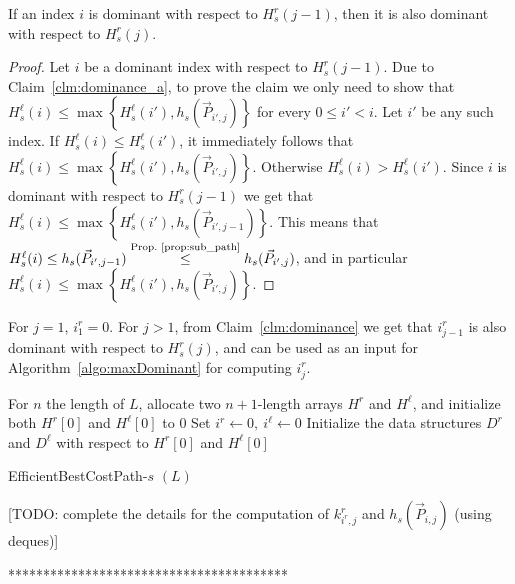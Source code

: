 \begin{claim}
	\label{clm:dominance}
	If an index $i$ is dominant with respect to $H^r_s(j-1)$, then it is also dominant with respect to  $H^r_s(j)$.
\end{claim}

\begin{proof}
	Let $i$ be a dominant index with respect to $H^r_s(j-1)$. Due to Claim~\ref{clm:dominance_a}, to prove the claim we only need to show that $H^\ell_s(i) \leq \max\left\{H^\ell_s(i'), h_s(\vec{P}_{i', j})\right\}$ for every $0 \leq i' < i$.
	Let $i'$ be any such index.
	If $H^\ell_s(i) \leq H^\ell_s(i')$, it immediately follows that $H^\ell_s(i) \leq \max\left\{H^\ell_s(i'), h_s(\vec{P}_{i', j})\right\}$.
	Otherwise  $H^\ell_s(i) > H^\ell_s(i')$. Since $i$ is dominant with respect to $H^r_s(j-1)$ we get that $H^\ell_s(i) \leq \max\left\{H^\ell_s(i'), h_s(\vec{P}_{i', j-1})\right\}$. This means that $H^\ell_s(i) \leq h_s(\vec{P}_{i', j-1}) \stackrel{\text{Prop.~\ref{prop:sub_path}}}{\leq} h_s(\vec{P}_{i', j})$, and in particular $H^\ell_s(i) \leq \max\left\{H^\ell_s(i'), h_s(\vec{P}_{i', j})\right\}$.
\end{proof}

For $j = 1$, $i^r_1 = 0$. For $j > 1$, from Claim~\ref{clm:dominance} we get that $i^r_{j-1}$ is also dominant with respect to $H^r_s(j)$, and can be used as an input for Algorithm~\ref{algo:maxDominant} for computing $i^r_j$.



\begin{algorithm}
	For $n$ the length of $L$, allocate two $n+1$-length arrays $H^r$ and $H^\ell$, and initialize both $H^r[0]$ and $H^{\ell}[0]$ to $0$\;
	Set $i^r \gets 0, \ i^\ell \gets 0$\;
	Initialize the data structures $D^r$ and $D^\ell$ with respect to $H^r[0]$ and $H^{\ell}[0]$\;
	\;
	\caption{EfficientBestCostPath-$s$ $(L)$}
	\label{algo:effH}
\end{algorithm}

[TODO: complete the details for the computation of $k^r_{i^r, j}$ and $h_s(\vec{P}_{i, j})$ (using deques)]

****************************************


